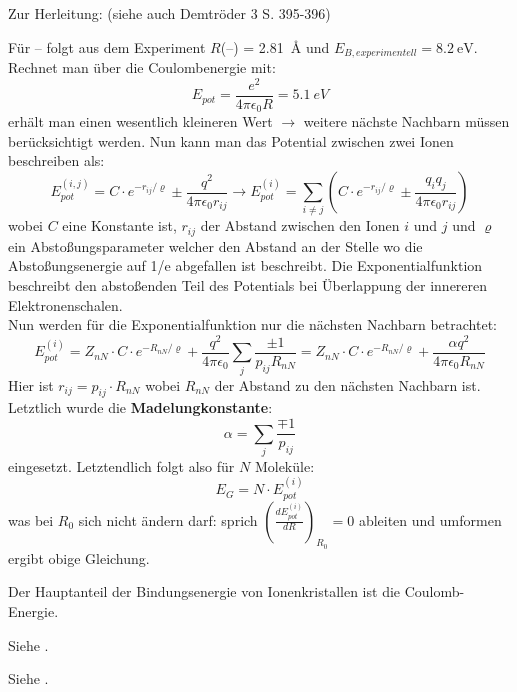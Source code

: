 Zur Herleitung: (siehe auch Demtröder 3 S. 395-396)

Für -- folgt aus dem Experiment $R$(--) = \SI{2.81}{\angstrom} und $E_{B,experimentell} = \SI{8.2}{\electronvolt}$.
Rechnet man über die Coulombenergie mit: 
\[E_{pot} = \frac{e^2}{4\pi\epsilon_0 R} = \SI{5.1}{eV}\]
erhält man einen wesentlich kleineren Wert $\rightarrow$ weitere nächste Nachbarn müssen berücksichtigt werden.
Nun kann man das Potential zwischen zwei Ionen beschreiben als: 
\[E_{pot}^{(i,j)} = C \cdot e^{-r_{ij}/\varrho}\pm \frac{q^2}{4\pi\epsilon_0 r_{ij}} \rightarrow E_{pot}^{(i)} = \sum_{i \ne j} \left( C \cdot e^{-r_{ij}/\varrho}\pm \frac{q_i q_j}{4\pi\epsilon_0 r_{ij}} \right)\]
wobei $C$ eine Konstante ist, $r_{ij}$ der Abstand zwischen den Ionen $i$ und $j$ und $\varrho$ ein Abstoßungsparameter welcher den Abstand an der Stelle wo die Abstoßungsenergie auf 1/e abgefallen ist beschreibt. Die Exponentialfunktion beschreibt den abstoßenden Teil des Potentials bei Überlappung der innereren Elektronenschalen. \\
Nun werden für die Exponentialfunktion nur die nächsten Nachbarn betrachtet: 
\[E_{pot}^{(i)} = Z_{nN} \cdot C \cdot e^{-R_{nN}/\varrho}+\frac{q^2}{4\pi\epsilon_0} \sum_j\frac{\pm 1}{p_{ij}R_{nN}} = Z_{nN} \cdot C \cdot e^{-R_{nN}/\varrho}+\frac{\alpha q^2}{4\pi\epsilon_0 R_{nN}}\]
Hier ist $r_{ij} = p_{ij} \cdot R_{nN}$ wobei $R_{nN}$ der Abstand zu den nächsten Nachbarn ist. Letztlich wurde die \textbf{Madelungkonstante}: 
\[\alpha = \sum_j \frac{\mp 1}{p_{ij}}\]
eingesetzt. Letztendlich folgt also für $N$ Moleküle:
\[E_G = N \cdot E_{pot}^{(i)}\]
was bei $R_0$ sich nicht ändern darf: sprich $\left(\frac{d E_{pot}^{(i)}}{d R}\right)_{R_0} = 0$ ableiten und umformen ergibt obige Gleichung. 

Der Hauptanteil der Bindungsenergie von Ionenkristallen ist die Coulomb-Energie. 

\label{q:66}

Siehe .

\label{q:67}

Siehe .

\label{q:68}

